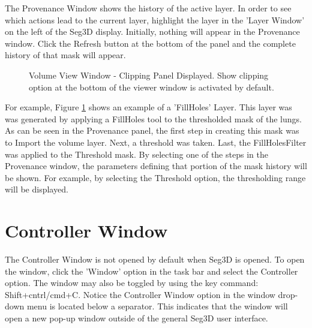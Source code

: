 \documentclass[fleqn,11pt,openany]{book}
\begin{document}
The Provenance Window shows the history of the active layer.  
In order to see which actions lead to the current layer, highlight the layer in the 'Layer Window' on the left of the Seg3D display.
Initially, nothing will appear in the Provenance window.
Click the Refresh button at the bottom of the panel and the complete history of that mask will appear.

\begin{figure}[b!]
\caption{Volume View Window - Clipping Panel Displayed. Show clipping option at the bottom of the viewer window is activated by default.}\label{fig:ProvenanceWindow}
\end{figure}

For example, Figure \ref{fig:ProvenanceWindow} shows an example of a 'FillHoles' Layer.
This layer was was generated by applying a FillHoles tool to the thresholded mask of the lungs.
As can be seen in the Provenance panel, the first step in creating this mask was to Import the volume layer.  
Next, a threshold was taken.  Last, the FillHolesFilter was applied to the Threshold mask.
By selecting one of the steps in the Provenance window, the parameters defining that portion of the mask history will be shown.
For example, by selecting the Threshold option, the thresholding range will be displayed.

\section{Controller Window}
The Controller Window is not opened by default when Seg3D is opened.  To open the window, click the 'Window' option in the task bar and select the Controller option.  The window may also be toggled by using the key command: Shift+cntrl/cmd+C.
Notice the Controller Window option in the window drop-down menu is located below a separator.  
This indicates that the window will open a new pop-up window outside of the general Seg3D user interface.
\end{document}
